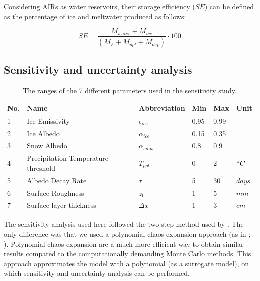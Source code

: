 \documentclass[utf8]{frontiersSCNS} %
\begin{document}
Considering AIRs as water reservoirs, their storage efficiency ($SE$) can be defined as the percentage of ice and
meltwater produced as follows:

\begin{equation} \textit{SE} = \frac{M_{water}+M_{ice}}{(M_F+M_{ppt}+M_{dep})} \cdot 100 \end{equation}


\subsection{Sensitivity and uncertainty analysis}

\begin{table}
	\centering
	\caption{The ranges of the 7 different parameters used in the sensitivity study.}
	\label{tab:parameters}
	\begin{tabular}{@{}llllll@{}}
		\toprule
		\textbf{No.} & \textbf{Name}                       & \textbf{Abbreviation} & \textbf{Min} & \textbf{Max} & \textbf{Unit} \\\midrule
		1            & Ice Emissivity                      & $\epsilon_{ice}$      & 0.95         & 0.99         &               \\
		2            & Ice Albedo                          & $\alpha_{ice}$        & 0.15         & 0.35         &               \\
		3            & Snow Albedo                         & $\alpha_{snow}$       & 0.8          & 0.9          &               \\
		4            & Precipitation Temperature threshold & $T_{ppt}$             & 0            & 2            & $\degree C$   \\
		5            & Albedo Decay Rate                   & $\tau$                & 5            & 30           & $days$        \\
		6            & Surface Roughness                   & $z_0$                 & 1            & 5            & $mm$          \\
		7            & Surface layer thickness             & $\Delta x$            & 1            & 3            & $cm$          \\\bottomrule
	\end{tabular}
\end{table}

The sensitivity analysis used here followed the two step method used by \cite{ZollesMaussion_2019}.  The only difference
was that we used a polynomial chaos expansion approach (as in \cite{uncertainpy_2018}; \cite{Xiu_2005}).  Polynomial
chaos expansion are a much more efficient way to obtain similar results compared to the computationally demanding Monte
Carlo methods. This approach approximates the model with a polynomial (as a surrogate model), on which sensitivity and
uncertainty analysis can be performed.
\end{document}
